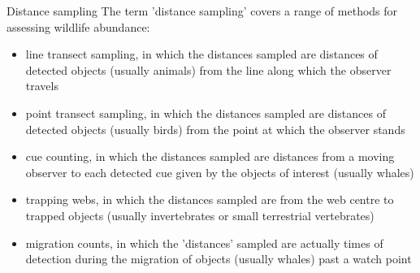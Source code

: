 Distance sampling
The term 'distance sampling' covers a range of methods for assessing wildlife abundance:
\begin{itemize}
\item	line transect sampling, in which the distances sampled are distances of detected objects (usually animals) from the line along which the observer travels 
\item	point transect sampling, in which the distances sampled are distances of detected objects (usually birds) from the point at which the observer stands 
\item	cue counting, in which the distances sampled are distances from a moving observer to each detected cue given by the objects of interest (usually whales) 
\item	trapping webs, in which the distances sampled are from the web centre to trapped objects (usually invertebrates or small terrestrial vertebrates) 
\item	migration counts, in which the 'distances' sampled are actually times of detection during the migration of objects (usually whales) past a watch point 
\end{itemize}
